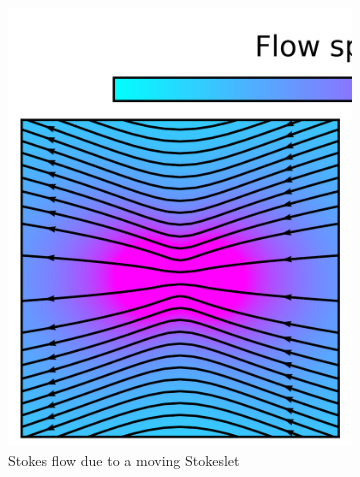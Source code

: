 \begin{figure}
    \captionsetup[subfigure]{format=subcap}
    \centering
    \begin{subfigure}[t]{0.45\linewidth}
        \centering%
        \includegraphics[width=\textwidth]{images_other/stokes_flow_left.png}%
        \caption{Stokes flow due to a moving Stokeslet}%
        \label{fig:flow_sphere_blake}%
    \end{subfigure}%
    \hspace{-20000sp}%
    \begin{subfigure}[t]{0.45\linewidth}%
        \centering%

\end{subfigure}
\end{figure}
